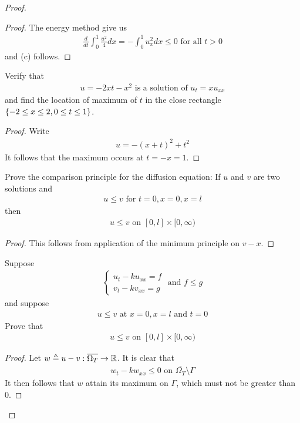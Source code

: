 \documentclass{report}
\begin{document}
\begin{proof}
\begin{proof}
The energy method give us 
\begin{align*}
\frac{d}{dt}\int_0^1 \frac{u^2}{4}dx = - \int_0^1 u_x^2dx \leq 0\text{ for all }t>0
\end{align*}
and (c) follows.
\end{proof}
\begin{question}{}{}
Verify that 
\begin{align*}
u=-2xt-x^2\text{ is a solution of }u_t=xu_{xx}
\end{align*}
and find the location of maximum of $t$ in the close rectangle $\{ -2\leq x\leq 2,0\leq t\leq 1 \}$. 
\end{question}
\begin{proof}
Write 
\begin{align*}
u=-(x+t)^2+t^2
\end{align*}
It follows that the maximum occurs at $t=-x=1$. 
\end{proof}
\begin{question}{}{}
Prove the comparison principle for the diffusion equation: If $u$ and  $v$ are two solutions and 
 \begin{align*}
u\leq v\text{ for }t=0,x=0,x=l
\end{align*}
then 
\begin{align*}
u\leq v\text{ on }[0,l]\times [0,\infty)
\end{align*}
\end{question}
\begin{proof}
This follows from application of the minimum principle on $v-x$. 
\end{proof}
\begin{question}{}{}
Suppose 
\begin{align*}
\begin{cases}
u_t-ku_{xx}=f\\
v_t-kv_{xx}=g
\end{cases}\text{ and }f\leq g
\end{align*}
and suppose 
\begin{align*}
u\leq v\text{ at }x=0,x=l\text{ and }t=0
\end{align*}
Prove that 
\begin{align*}
u\leq v\text{ on }[0,l]\times[0,\infty)
\end{align*}
\end{question}
\begin{proof}
Let $w\triangleq u-v:\overline{\Omega_T}\rightarrow \mathbb{R}$. It is clear that 
\begin{align*}
w_t-kw_{xx}\leq 0\text{ on }\overline{\Omega_T}\setminus \Gamma 
\end{align*}
It then follows that $w$ attain its maximum on $\Gamma $, which must not be greater than $0$. 
\end{proof}

\end{proof}
\end{document}
